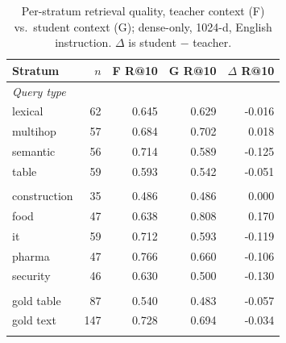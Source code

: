 \begin{table}[t]
\centering
\small
\caption{Per-stratum retrieval quality, teacher context (F) vs.\ student context (G); dense-only, 1024-d, English instruction. $\Delta$ is student $-$ teacher.}
\label{tab:strata}
\begin{tabular}{lrrrr}
\toprule
Stratum & $n$ & F R@10 & G R@10 & $\Delta$ R@10 \\
\midrule
\multicolumn{5}{l}{\emph{Query type}} \\
\quad lexical & 62 & 0.645 & 0.629 & -0.016 \\
\quad multihop & 57 & 0.684 & 0.702 & 0.018 \\
\quad semantic & 56 & 0.714 & 0.589 & -0.125 \\
\quad table & 59 & 0.593 & 0.542 & -0.051 \\
\addlinespace[2pt]
\multicolumn{5}{l}{\emph{Category}} \\
\quad construction & 35 & 0.486 & 0.486 & 0.000 \\
\quad food & 47 & 0.638 & 0.808 & 0.170 \\
\quad it & 59 & 0.712 & 0.593 & -0.119 \\
\quad pharma & 47 & 0.766 & 0.660 & -0.106 \\
\quad security & 46 & 0.630 & 0.500 & -0.130 \\
\addlinespace[2pt]
\multicolumn{5}{l}{\emph{Gold chunk}} \\
\quad gold table & 87 & 0.540 & 0.483 & -0.057 \\
\quad gold text & 147 & 0.728 & 0.694 & -0.034 \\
\addlinespace[2pt]
\bottomrule
\end{tabular}
\end{table}
